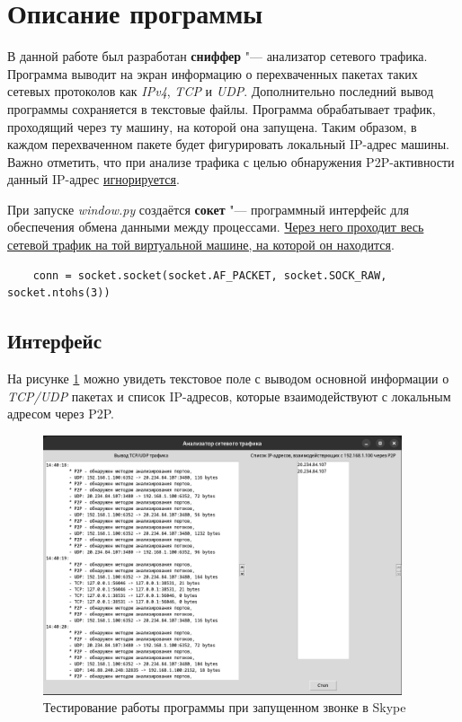 \documentclass[bachelor, och, coursework]{SCWorks}
\begin{document}
\section{Описание программы}
В данной работе был разработан \textbf{сниффер} "--- анализатор сетевого трафика. 
Программа выводит на экран информацию о перехваченных пакетах таких сетевых протоколов как \textit{IPv4}, \textit{TCP} и \textit{UDP}. 
Дополнительно последний вывод программы сохраняется в текстовые файлы. Программа обрабатывает трафик, проходящий через ту машину, на которой
она запущена. Таким образом, в каждом перехваченном пакете будет фигурировать локальный IP-адрес машины. Важно отметить, что при анализе трафика
с целью обнаружения P2P-активности данный IP-адрес \underline{игнорируется}.

При запуске \textit{window.py} создаётся \textbf{сокет} "--- программный интерфейс для обеспечения обмена данными между процессами. 
\underline{Через него проходит весь} \\ \underline{сетевой трафик на той виртуальной машине, на которой он находится}. %

\begin{verbatim}
    conn = socket.socket(socket.AF_PACKET, socket.SOCK_RAW, socket.ntohs(3))
\end{verbatim}

\subsection{Интерфейс}
На рисунке \ref{ris:test} можно увидеть текстовое поле с выводом основной информации о \textit{TCP/UDP} пакетах и 
список IP-адресов, которые взаимодействуют с локальным адресом через P2P.
\begin{figure}[H]
    \centering
    \includegraphics[width=0.94\textwidth]{test2.png}
    \caption{Тестирование работы программы при запущенном звонке в Skype}
    \label{ris:test}
\end{figure}
\end{document}
